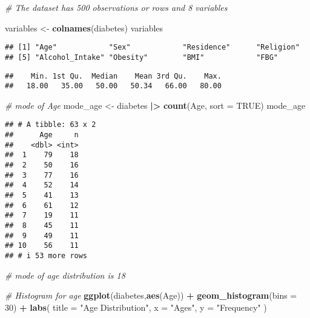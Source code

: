 \documentclass[
]{article}
\newenvironment{Shaded}{\begin{snugshade}}{\end{snugshade}}
\newcommand{\AttributeTok}[1]{\textcolor[rgb]{0.13,0.29,0.53}{#1}}
\newcommand{\CommentTok}[1]{\textcolor[rgb]{0.56,0.35,0.01}{\textit{#1}}}
\newcommand{\ConstantTok}[1]{\textcolor[rgb]{0.56,0.35,0.01}{#1}}
\newcommand{\DecValTok}[1]{\textcolor[rgb]{0.00,0.00,0.81}{#1}}
\newcommand{\FunctionTok}[1]{\textcolor[rgb]{0.13,0.29,0.53}{\textbf{#1}}}
\newcommand{\NormalTok}[1]{#1}
\newcommand{\OtherTok}[1]{\textcolor[rgb]{0.56,0.35,0.01}{#1}}
\newcommand{\SpecialCharTok}[1]{\textcolor[rgb]{0.81,0.36,0.00}{\textbf{#1}}}
\newcommand{\StringTok}[1]{\textcolor[rgb]{0.31,0.60,0.02}{#1}}
\begin{document}
\begin{Shaded}
\begin{Highlighting}[]
\CommentTok{\# The dataset has 500 observations or rows and 8 variables}

\NormalTok{variables }\OtherTok{\textless{}{-}} \FunctionTok{colnames}\NormalTok{(diabetes)}
\NormalTok{variables}
\end{Highlighting}
\end{Shaded}

\begin{verbatim}
## [1] "Age"            "Sex"            "Residence"      "Religion"      
## [5] "Alcohol_Intake" "Obesity"        "BMI"            "FBG"
\end{verbatim}

\begin{Shaded}
\end{Shaded}

\begin{verbatim}
##    Min. 1st Qu.  Median    Mean 3rd Qu.    Max. 
##   18.00   35.00   50.00   50.34   66.00   80.00
\end{verbatim}

\begin{Shaded}
\begin{Highlighting}[]
\CommentTok{\# mode of Age}
\NormalTok{mode\_age }\OtherTok{\textless{}{-}}\NormalTok{ diabetes }\SpecialCharTok{|\textgreater{}}
  \FunctionTok{count}\NormalTok{(Age, }\AttributeTok{sort =} \ConstantTok{TRUE}\NormalTok{)}
\NormalTok{mode\_age}
\end{Highlighting}
\end{Shaded}

\begin{verbatim}
## # A tibble: 63 x 2
##      Age     n
##    <dbl> <int>
##  1    79    18
##  2    50    16
##  3    77    16
##  4    52    14
##  5    41    13
##  6    61    12
##  7    19    11
##  8    45    11
##  9    49    11
## 10    56    11
## # i 53 more rows
\end{verbatim}

\begin{Shaded}
\begin{Highlighting}[]
\CommentTok{\# mode of age distribution is 18  }

\CommentTok{\# Histogram for age}
\FunctionTok{ggplot}\NormalTok{(diabetes,}\FunctionTok{aes}\NormalTok{(Age)) }\SpecialCharTok{+}
  \FunctionTok{geom\_histogram}\NormalTok{(}\AttributeTok{bins =} \DecValTok{30}\NormalTok{) }\SpecialCharTok{+}
  \FunctionTok{labs}\NormalTok{(}
    \AttributeTok{title =} \StringTok{"Age Distribution"}\NormalTok{,}
    \AttributeTok{x =} \StringTok{"Ages"}\NormalTok{,}
    \AttributeTok{y =} \StringTok{"Frequency"}
\NormalTok{  )}
\end{Highlighting}
\end{Shaded}
\end{document}
